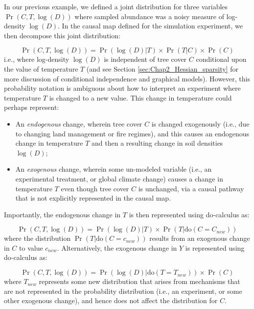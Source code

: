 In our previous example, we defined a joint distribution for three variables \( \Pr(C,T,\log(D)) \) where sampled abundance was a noisy measure of log-density \(\log(D)\).  In the causal map defined for the simulation experiment, we then decompose this joint distribution:

\begin{equation}
    \Pr(C,T,\log(D)) = \Pr(\log(D)|T) \times \Pr(T|C) \times \Pr(C)
\end{equation}
i.e., where log-density \(\log(D)\) is independent of tree cover \(C\) conditional upon the value of temperature \(T\) (and see Section \ref{sec:Chap2_Hessian_sparsity} for more discussion of conditional independence and graphical models).  However, this probability notation is ambiguous about how to interpret an experiment where temperature \(T\) is changed to a new value.  This change in temperature could perhaps represent:
\begin{itemize}
    \item An \textit{endogenous} change, wherein tree cover \(C\) is changed exogenously (i.e., due to changing land management or fire regimes), and this causes an endogenous change in temperature \(T\) and then a resulting change in soil densities \(\log(D)\);

    \item An \textit{exogenous} change, wherein some un-modeled variable (i.e., an experimental treatment, or global climate change) causes a change in temperature \(T\) even though tree cover \(C\) is unchanged, via a causal pathway that is not explicitly represented in the causal map.
\end{itemize}
Importantly, the endogenous change in \(T\) is then represented using do-calculus as:

\begin{equation}
    \Pr(C,T,\log(D)) = \Pr(\log(D)|T) \times \Pr(T|\mathrm{do}(C=C_{new}))  
\end{equation}
where the distribution \(\Pr(T|\mathrm{do}(C=c_{new}))\) results from an exogenous change in \(C\) to value \(c_{new}\).  Alternatively, the exogenous change in \(Y\) is represented using do-calculus as:

\begin{equation}
    \Pr(C,T,\log(D)) = \Pr(\log(D)|\mathrm{do}(T=T_{new})) \times \Pr(C) 
\end{equation}
where \(T_{new}\) represents some new distribution that arises from mechanisms that are not represented in the probability distribution (i.e., an experiment, or some other exogenous change), and hence does not affect the distribution for \(C\).

